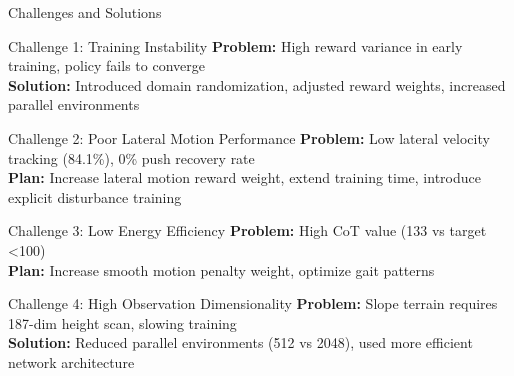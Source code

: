 \documentclass[aspectratio=169]{beamer}
\begin{document}
\begin{frame}{Challenges and Solutions}
\begin{block}{Challenge 1: Training Instability}
\textbf{Problem:} High reward variance in early training, policy fails to converge\\
\textbf{Solution:} Introduced domain randomization, adjusted reward weights, increased parallel environments
\end{block}

\begin{block}{Challenge 2: Poor Lateral Motion Performance}
\textbf{Problem:} Low lateral velocity tracking (84.1\%), 0\% push recovery rate\\
\textbf{Plan:} Increase lateral motion reward weight, extend training time, introduce explicit disturbance training
\end{block}

\begin{block}{Challenge 3: Low Energy Efficiency}
\textbf{Problem:} High CoT value (133 vs target <100)\\
\textbf{Plan:} Increase smooth motion penalty weight, optimize gait patterns
\end{block}

\begin{block}{Challenge 4: High Observation Dimensionality}
\textbf{Problem:} Slope terrain requires 187-dim height scan, slowing training\\
\textbf{Solution:} Reduced parallel environments (512 vs 2048), used more efficient network architecture
\end{block}
\end{frame}
\end{document}
